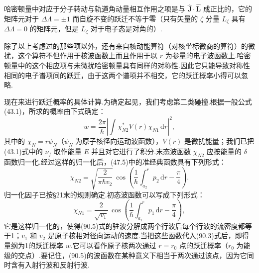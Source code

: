 哈密顿量中对应于分子转动与轨道角动量相互作用之项是与 $\hat{\boldsymbol{J}}\cdot\hat{\boldsymbol{L}}$ 成正比的，它的矩阵元对于 $\Delta\Lambda=\pm1$ 而自旋不变的跃迁不等于零（只有矢量的 $\zeta$ 分量 $L_\zeta$ 具有 $\Delta\Lambda=0$ 的矩阵元，但是 $L_\zeta$ 对于电子态是对角的）.

除了以上考虑过的那些项以外，还有来自核动能算符（对核坐标微商的算符）的微扰，这个算符不但作用于核波函数上而且作用于以 $r$ 为参量的电子波函数上.哈密顿量中的这个相应项与未微扰哈密顿量具有同样的对称性.因此它只能导致对称性相同的电子谱项间的跃迁，由于这两个谱项并不相交，它的跃迁概率小得可以忽略.

现在来进行跃迁概率的具体计算.为确定起见，我们考虑第二类碰撞.根据一般公式(43.1)，所求的概率由下式确定：
\begin{equation}
  w=\frac{2\pi}{\hbar}\left|\int\chi_{N2}^*V(r)\chi_{N1}\,\mathrm{d}r\right|^2,
\end{equation}
其中的 $\chi_N=r\psi_N$（$\psi_N$ 为原子核径向运动波函数），$V(r)$ 是微扰能量；我们已把(43.1)式中的 $\nu_f$ 取作能量 $E$ 并且对它进行了积分.末态波函数 $\chi_{N2}$ 应按能量的 $\delta$ 函数归一化.经过这样的归一化后，(47.5)中的准经典函数具有下列形式：
\begin{equation}
  \chi_{N2}=\sqrt{\frac{2}{\pi\hbar v_2}}\,
  \cos\left(\frac{1}{\hbar}\int_{a_2}^r p_2\,\mathrm{d}r-\frac{\pi}{4}\right).
\end{equation}
归一化因子已按§21末的规则确定.初态波函数可以写成下列形式：
\begin{equation}
  \chi_{N1}=\frac{2}{\sqrt{v_1}}\,
  \cos\left(\frac{1}{\hbar}\int_{a_1}^r p_1\,\mathrm{d}r-\frac{\pi}{4}\right),
\end{equation}
它是这样归一化的，使得(90.5)式的驻波分解成两个行波后每个行波的流密度都等于1；$v_1$ 和 $v_2$ 是原子核相对径向运动的速度.当把这些函数代入(90.3)式后，即得量纲为1的跃迁概率 $w$.它可以看作原子核两次通过 $r=r_0$ 点的跃迁概率（$r_0$ 为能级的交点）.要记住，(90.5)的波函数在某种意义下相当于两次通过该点，因为它同时含有入射行波和反射行波.

